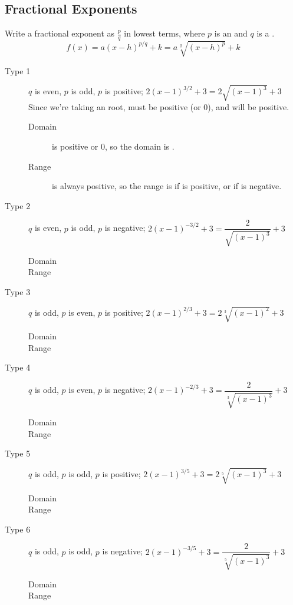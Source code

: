 \subsection{Fractional Exponents} 
Write a fractional exponent as $\frac{p}{q}$ in lowest terms, where $p$ is an \makeblank[1in] and $q$ is a \makeblank[1in].
\[
f(x)=a(x-h)^{p/q}+k=a\sqrt[q]{\left(x-h\right)^p}+k
\]
\begin{description}
\item[Type 1]$q$ is even, $p$ is odd, $p$ is positive; 
             $2(x-1)^{3/2}+3=2\sqrt{\left(x-1\right)^3}+3$\\
	Since we're taking an \makeblank[1in] root, \makeblank[1in] must be positive (or 0), 
	and \makeblank[1in] will be positive.
	\begin{description}
	\item[Domain] \makeblank[1in] is positive or 0, so the domain is \makeblank.
	\item[Range] \makeblank[1in] is always positive, so the range is \makeblank if \makeblanksmall is positive, or \makeblank if \makeblanksmall is negative.
	\end{description}
\item[Type 2]$q$ is even, $p$ is odd, $p$ is negative; 
             $2(x-1)^{-3/2}+3=\dfrac{2}{\sqrt{\left(x-1\right)^3}}+3$
	\begin{description}
	\item[Domain]
	\item[Range]
	\end{description}
\item[Type 3]$q$ is odd, $p$ is even, $p$ is positive; 
             $2(x-1)^{2/3}+3=2\sqrt[3]{\left(x-1\right)^2}+3$
	\begin{description}
	\item[Domain]
	\item[Range]
	\end{description}
\item[Type 4]$q$ is odd, $p$ is even, $p$ is negative; 
             $2(x-1)^{-2/3}+3=\dfrac{2}{\sqrt[3]{\left(x-1\right)^3}}+3$
	\begin{description}
	\item[Domain]
	\item[Range]
	\end{description}
\item[Type 5]$q$ is odd, $p$ is odd, $p$ is positive; 
             $2(x-1)^{3/5}+3=2\sqrt[5]{\left(x-1\right)^3}+3$
	\begin{description}
	\item[Domain]
	\item[Range]
	\end{description}
\item[Type 6]$q$ is odd, $p$ is odd, $p$ is negative; 
             $2(x-1)^{-3/5}+3=\dfrac{2}{\sqrt[5]{\left(x-1\right)^3}}+3$
	\begin{description}
	\item[Domain]
	\item[Range]
	\end{description}
\end{description}